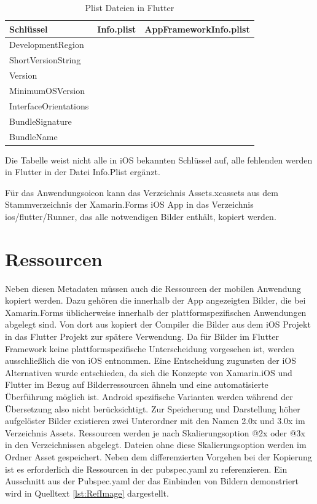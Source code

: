 \begin{table}[!ht]
  \begin{tabularx}{\linewidth}{X| X| X}
  \textbf{Schlüssel}  &  \textbf{Info.plist} & \textbf{AppFrameworkInfo.plist} \\
\hline
  DevelopmentRegion  		&  					& 		\checkmark	 \\
  ShortVersionString  		&  					& 		\checkmark	 \\
  Version  							&  					& 		\checkmark	 \\
  MinimumOSVersion  		&  					& 		\checkmark	 \\
  
  InterfaceOrientations  		& \checkmark  	&		 					\\
  BundleSignature  			&  \checkmark 	& 							\\
   BundleName  					&  \checkmark 	& 		 					\\
\end{tabularx}
\caption{Plist Dateien in Flutter }
 \label{tab:InfoPlist}
\end{table}
Die Tabelle weist nicht alle in iOS bekannten Schlüssel auf,  alle fehlenden werden in Flutter in der Datei Info.Plist ergänzt.

Für das Anwendungsoicon kann das Verzeichnis Assets.xcassets aus dem Stammverzeichnis der Xamarin.Forms iOS App in das Verzeichnis ios/flutter/Runner, das alle notwendigen Bilder enthält,  kopiert werden. 

\section{Ressourcen}

Neben diesen Metadaten müssen auch die Ressourcen der mobilen Anwendung kopiert werden. 
Dazu gehören die innerhalb der App angezeigten Bilder, die bei Xamarin.Forms
üblicherweise innerhalb der plattformspezifischen Anwendungen abgelegt sind.
Von dort aus kopiert der Compiler die Bilder aus dem iOS Projekt in das Flutter Projekt zur spätere Verwendung.  Da für Bilder im Flutter Framework keine plattformspezifische Unterscheidung vorgesehen ist,  werden ausschließlich die von iOS entnommen. Eine Entscheidung zugunsten der iOS Alternativen wurde  entschieden,  da sich die Konzepte von Xamarin.iOS und Flutter im Bezug auf Bilderressourcen ähneln und eine automatisierte Überführung möglich ist.  Android spezifische Varianten werden während der Übersetzung also nicht berücksichtigt.   
Zur Speicherung und Darstellung höher aufgelöster Bilder existieren zwei Unterordner mit den Namen 2.0x und 3.0x im Verzeichnis Assets.  Ressourcen werden je nach Skalierungsoption @2x oder @3x in den Verzeichnissen abgelegt. Dateien ohne diese Skalierungsoption werden im Ordner Asset gespeichert.
Neben dem differenzierten Vorgehen bei der Kopierung ist es erforderlich die Ressourcen in der pubspec.yaml zu referenzieren.  Ein Ausschnitt aus der Pubspec.yaml der das Einbinden von Bildern demonstriert wird in Quelltext  \ref{lst:RefImage} dargestellt.

